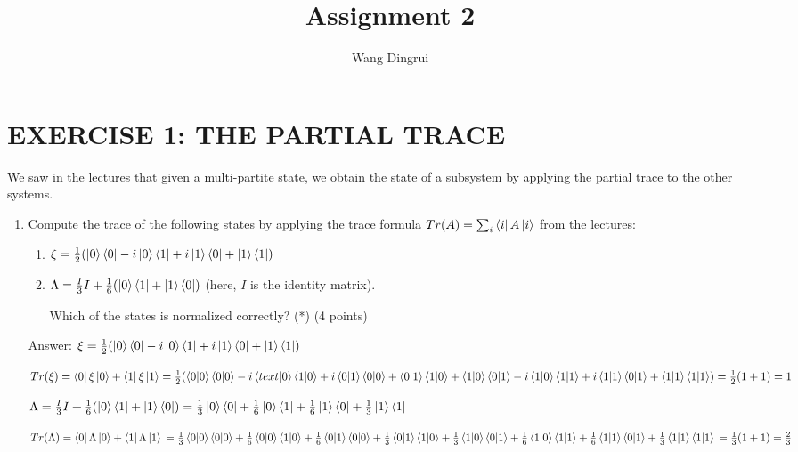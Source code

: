 \documentclass{article}
\title{Assignment 2}
\author{Wang Dingrui}
\begin{document}
\maketitle

\section{EXERCISE 1: THE PARTIAL TRACE}

We saw in the lectures that given a multi-partite state, we obtain the state of a subsystem by applying the partial trace to the other systems.

\begin{enumerate}
    \item Compute the trace of the following states by applying the trace formula $ Tr(A)=\sum_i\bra{i}A\ket{i} $ from the lectures:
          \begin{enumerate}
              \item $\xi = \frac{1}{2}(\ket{0}\bra{0} - i\ket{0}\bra{1} + i\ket{1}\bra{0} + \ket{1}\bra{1})$
              \item $\Lambda = \frac{I}{3}I + \frac{1}{6}(\ket{0}\bra{1} + \ket{1}\bra{0})$ (here, $I$ is the identity matrix).

                    Which of the states is normalized correctly? (*) (4 points)
          \end{enumerate}
          Answer: $\xi = \frac{1}{2}(\ket{0}\bra{0} - i\ket{0}\bra{1} + i\ket{1}\bra{0} + \ket{1}\bra{1})$

          $Tr(\xi) = \bra{0}\xi\ket{0}+\bra{1}\xi\ket{1}
              =\frac{1}{2}(\braket{0|0}\braket{0|0}-i\braket{text|0}\braket{1|0}+i\braket{0|1}\braket{0|0}+\braket{0|1}\braket{1|0}
              +\braket{1|0}\braket{0|1}-i\braket{1|0}\braket{1|1}+i\braket{1|1}\braket{0|1}+\braket{1|1}\braket{1|1})
              =\frac{1}{2}(1+1)
              =1
          $

          $\Lambda = \frac{I}{3}I + \frac{1}{6}(\ket{0}\bra{1} + \ket{1}\bra{0})
              =\frac{1}{3}\ket{0}\bra{0}+\frac{1}{6}\ket{0}\bra{1}+\frac{1}{6}\ket{1}\bra{0}+\frac{1}{3}\ket{1}\bra{1}
          $


          $Tr(\Lambda) = \bra{0}\Lambda\ket{0}+\bra{1}\Lambda\ket{1}
              \\=\frac{1}{3}\braket{0|0}\braket{0|0}+\frac{1}{6}\braket{0|0}\braket{1|0}+\frac{1}{6}\braket{0|1}\braket{0|0}+\frac{1}{3}\braket{0|1}\braket{1|0}
              +\frac{1}{3}\braket{1|0}\braket{0|1}+\frac{1}{6}\braket{1|0}\braket{1|1}+\frac{1}{6}\braket{1|1}\braket{0|1}+\frac{1}{3}\braket{1|1}\braket{1|1}
              \\=\frac{1}{3}(1+1)
              \\=\frac{2}{3}
          $


\end{enumerate}
\end{document}
